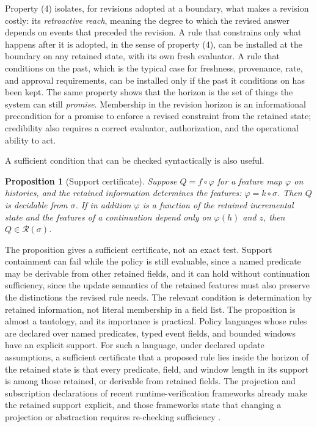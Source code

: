 \documentclass[11pt]{article}
\newtheorem{proposition}{Proposition}
\theoremstyle{definition}
\theoremstyle{remark}
\newcommand{\Hor}{\mathcal{R}}
\begin{document}
Property (4) isolates, for revisions adopted at a boundary, what makes a revision costly: its \emph{retroactive reach}, meaning the degree to which the revised answer depends on events that preceded the revision. A rule that constrains only what happens after it is adopted, in the sense of property (4), can be installed at the boundary on any retained state, with its own fresh evaluator. A rule that conditions on the past, which is the typical case for freshness, provenance, rate, and approval requirements, can be installed only if the past it conditions on has been kept. The same property shows that the horizon is the set of things the system can still \emph{promise}. Membership in the revision horizon is an informational precondition for a promise to enforce a revised constraint from the retained state; credibility also requires a correct evaluator, authorization, and the operational ability to act.

A sufficient condition that can be checked syntactically is also useful.

\begin{proposition}[Support certificate]\label{prop:support}
Suppose $Q=f\circ\varphi$ for a feature map $\varphi$ on histories, and the retained information determines the features: $\varphi=k\circ\sigma$. Then $Q$ is decidable from $\sigma$. If in addition $\varphi$ is a function of the retained incremental state and the features of a continuation depend only on $\varphi(h)$ and $z$, then $Q\in\Hor(\sigma)$.
\end{proposition}

The proposition gives a sufficient certificate, not an exact test. Support containment can fail while the policy is still evaluable, since a named predicate may be derivable from other retained fields, and it can hold without continuation sufficiency, since the update semantics of the retained features must also preserve the distinctions the revised rule needs. The relevant condition is determination by retained information, not literal membership in a field list. The proposition is almost a tautology, and its importance is practical. Policy languages whose rules are declared over named predicates, typed event fields, and bounded windows have an explicit support. For such a language, under declared update assumptions, a sufficient certificate that a proposed rule lies inside the horizon of the retained state is that every predicate, field, and window length in its support is among those retained, or derivable from retained fields. The projection and subscription declarations of recent runtime-verification frameworks already make the retained support explicit, and those frameworks state that changing a projection or abstraction requires re-checking sufficiency \cite{agenticrv}.
\end{document}
